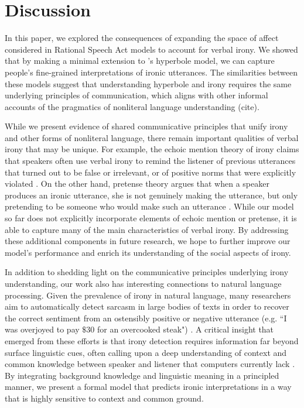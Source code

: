 \documentclass[10pt,letterpaper]{article}
\begin{document}
\section{Discussion}
In this paper, we explored the consequences of expanding the space of affect considered in Rational Speech Act models to account for verbal irony. We showed that by making a minimal extension to 's hyperbole model, we can capture people's fine-grained interpretations of ironic utterances. The similarities between these models suggest that understanding hyperbole and irony requires the same underlying principles of communication, which aligns with other informal accounts of the pragmatics of nonliteral language understanding (cite).  

While we present evidence of shared communicative principles that unify irony and other forms of nonliteral language, there remain important qualities of verbal irony that may be unique. For example, the echoic mention theory of irony claims that speakers often use verbal irony to remind the listener of previous utterances that turned out to be false or irrelevant, or of positive norms that were explicitly violated \cite{sperber1981irony, jorgensen1984test}. On the other hand, pretense theory argues that when a speaker produces an ironic utterance, she is not genuinely making the utterance, but only pretending to be someone who would make such an utterance \cite{clark1984pretense}. 
While our model so far does not explicitly incorporate elements of echoic mention or pretense, it is able to capture many of the main characteristics of verbal irony. By addressing these additional components in future research, we hope to further improve our model's performance and enrich its understanding of the social aspects of irony. 

In addition to shedding light on the communicative principles underlying irony understanding, our work also has interesting connections to natural language processing. Given the prevalence of irony in natural language, many researchers aim to automatically detect sarcasm in large bodies of texts in order to recover the correct sentiment from an ostensibly positive or negative utterance (e.g. ``I was overjoyed to pay $\$30$ for an overcooked steak") \cite{davidov2010semi, filatova2012irony}. A critical insight that emerged from these efforts is that irony detection requires information far beyond surface linguistic cues, often calling upon a deep understanding of context and common knowledge between speaker and listener that computers currently lack \cite{gonzalez2011identifying, wallacehumans}. By integrating background knowledge and linguistic meaning in a principled manner, we present a formal model that predicts ironic interpretations in a way that is highly sensitive to context and common ground. 
\end{document}
